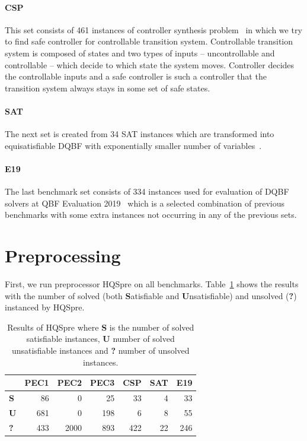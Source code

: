 \documentclass[
  digital, %
  color,
  twoside, %
  table,   %
  nolof,     %
  nolot,     %
]{fithesis3}
\theoremstyle{definition}
\theoremstyle{remark}
\begin{document}
\paragraph{CSP}
This set consists of 461 instances of controller synthesis problem~\cite{CSPbenchmarks} in which we try to find safe controller for controllable transition system. Controllable transition system is composed of states and two types of inputs -- uncontrollable and controllable -- which decide to which state the system moves. Controller decides the controllable inputs and a safe controller is such a controller that the transition system always stays in some set of safe states.

\paragraph{SAT}
The next set is created from 34 SAT instances which are transformed into equisatisfiable DQBF with exponentially smaller number of variables~\cite{SATbenchmarks}.

\paragraph{E19}
The last benchmark set consists of 334 instances used for evaluation of DQBF solvers at QBF Evaluation 2019~\cite{QBFeval19} which is a selected combination of previous benchmarks with some extra instances not occurring in any of the previous sets.


\section{Preprocessing}
First, we run preprocessor HQSpre on all benchmarks. Table~\ref{tab:HQSpre} shows the results with the number of solved (both \textbf{S}atisfiable and \textbf{U}n\-sa\-ti\-sfi\-able) and unsolved (\textbf{?}) instanced by HQSpre.

\begin{table}[ht]
\centering
\caption{Results of HQSpre where \textbf{S} is the number of solved satisfiable instances, \textbf{U} number of solved unsatisfiable instances and \textbf{?} number of unsolved instances.}
\label{tab:HQSpre}
\begin{tabular}{c|r|r|r|r|r|r|}
\hhline{~*{6}{-}}
\cellcolor{white}                %
& \textbf{PEC1} & \textbf{PEC2} & \textbf{PEC3} & \textbf{CSP} & \textbf{SAT} & \textbf{E19} \\ \hline
\multicolumn{1}{|l|}{\textbf{S}} %
& 86 & 0 & 25 & 33 & 4 & 33 \\ \hline
\multicolumn{1}{|l|}{\textbf{U}} %
& 681 & 0 & 198 & 6 & 8 & 55 \\ \hline
\multicolumn{1}{|l|}{\textbf{?}} %
& 433 & \num{2000} & 893 & 422 & 22 & 246 \\ \hline
\end{tabular}
\end{table}
\end{document}
